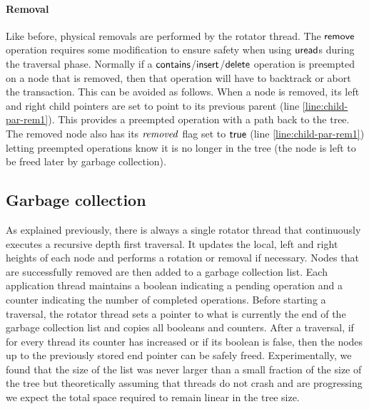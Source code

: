 \paragraph{Removal}
Like before, physical removals are performed by the rotator thread.
The $\act{remove}$ operation requires some modification to ensure safety when using $\act{uread}$s during the traversal phase.
Normally if a $\act{contains}$/$\act{insert}$/$\act{delete}$ operation is preempted on a node that is removed, then that operation will have to backtrack or abort the transaction.
This can be avoided as follows.
When a node is removed, its left and right child pointers are set to point to its previous parent (line \ref{line:child-par-rem1}).%
This provides a preempted operation with a path back to the tree.
The removed node also has its $\ms{removed}$ flag set to $\lit{true}$ (line \ref{line:child-par-rem1}) 
letting preempted operations know it is no longer in the tree (the node is left to be freed later by garbage collection).

\subsection{Garbage collection}\label{ssec:gc}

As explained previously, there is always a single rotator thread that continuously executes a recursive depth 
first traversal. 
It updates the local, left and right heights of each node and performs a rotation
or removal
if necessary. Nodes that are successfully removed are then added to a
garbage collection list.
Each 
application thread maintains a boolean indicating a pending operation and a counter indicating the number of 
completed operations. Before starting a traversal, the rotator thread sets a pointer to what is currently the end of 
the garbage collection list and copies all booleans and counters. After a traversal, if for every thread its counter 
has increased or if its boolean is false, then the nodes up to the previously stored end pointer can be safely 
freed. Experimentally, we found that the size of the list was never larger than a small fraction of the size of the 
tree but theoretically assuming that threads do not crash and are progressing
we expect the total space required to remain linear in the tree size.


